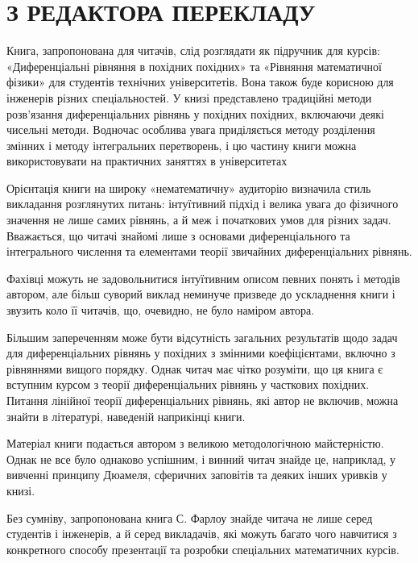 \documentclass[
  ukrainian,
]{article}
\begin{document}
\section{З РЕДАКТОРА
ПЕРЕКЛАДУ}\label{ux437-ux440ux435ux434ux430ux43aux442ux43eux440ux430-ux43fux435ux440ux435ux43aux43bux430ux434ux443}

Книга, запропонована для читачів, слід розглядати як підручник для
курсів: «Диференціальні рівняння в похідних похідних» та «Рівняння
математичної фізики» для студентів технічних університетів. Вона також
буде корисною для інженерів різних спеціальностей. У книзі представлено
традиційні методи розв'язання диференціальних рівнянь у похідних
похідних, включаючи деякі чисельні методи. Водночас особлива увага
приділяється методу розділення змінних і методу інтегральних
перетворень, і цю частину книги можна використовувати на практичних
заняттях в університетах

Орієнтація книги на широку «нематематичну» аудиторію визначила стиль
викладання розглянутих питань: інтуїтивний підхід і велика увага до
фізичного значення не лише самих рівнянь, а й меж і початкових умов для
різних задач. Вважається, що читачі знайомі лише з основами
диференціального та інтегрального числення та елементами теорії
звичайних диференціальних рівнянь.

Фахівці можуть не задовольнитися інтуїтивним описом певних понять і
методів автором, але більш суворий виклад неминуче призведе до
ускладнення книги і звузить коло її читачів, що, очевидно, не було
наміром автора.

Більшим запереченням може бути відсутність загальних результатів щодо
задач для диференціальних рівнянь у похідних з змінними коефіцієнтами,
включно з рівняннями вищого порядку. Однак читач має чітко розуміти, що
ця книга є вступним курсом з теорії диференціальних рівнянь у часткових
похідних. Питання лінійної теорії диференціальних рівнянь, які автор не
включив, можна знайти в літературі, наведеній наприкінці книги.

Матеріал книги подається автором з великою методологічною майстерністю.
Однак не все було однаково успішним, і винний читач знайде це,
наприклад, у вивченні принципу Дюамеля, сферичних заповітів та деяких
інших уривків у книзі.

Без сумніву, запропонована книга С. Фарлоу знайде читача не лише серед
студентів і інженерів, а й серед викладачів, які можуть багато чого
навчитися з конкретного способу презентації та розробки спеціальних
математичних курсів.
\end{document}
